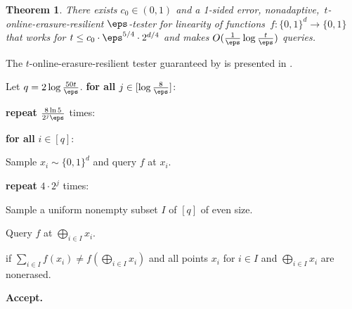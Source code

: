 \documentclass[11pt]{article}
\numberwithin{equation}{section}
\newtheorem{theorem}{Theorem}[section]
\theoremstyle{definition}
\theoremstyle{plain}
\begin{document}
\begin{theorem}\label{thm:linearity_3}
There exists %
$c_0 \in (0,1)$ and a 1-sided error, nonadaptive,~$t$-online-erasure-resilient $\eps$-tester for linearity of functions~$f\colon \{0,1\}^d \to \{0,1\}$ that  works for $t \leq c_0\cdot\eps^{5/4} \cdot  2^{d/4}$ and makes $O(\frac{1}{\eps}\log \frac{t}{\eps})$ queries.
\end{theorem}




The $t$-online-erasure-resilient tester guaranteed by  is presented in .


\begin{algorithm} 
	\caption{An Online-Erasure-Resilient Linearity Tester}
	\begin{algorithmic}[1]
		
		\State Let $q = 2\log\frac{50t}\eps$. \label{step:define_q}
		\State\textbf{for all} $j \in [\log \frac 8 \eps]$: \label{step:define_j}
		
		\State\label{step:repeat} \indent \textbf{repeat} $\frac{8 \ln 5}{2^j\eps}$ times:
 		
		\State \indent \indent \textbf{for all} {$i \in [q]$}:\label{step:loop_query_x_i}

		\State \indent \indent \indent Sample $x_i \sim \{0,1\}^d$ and query $f$ at $x_i$. \label{step:query_x_i}
		
		\State \indent \indent\textbf{repeat} $4 \cdot 2^j$ times:\label{step:query_sums}
		

        \State \indent \indent \indent Sample a uniform nonempty subset $I$ of $[q]$ of even size.
        
        
        \State \indent \indent \indent Query $f$ at $\bigoplus_{i \in I}{x_i}$.\label{step:sample-I}
		
		\State \indent \indent {} if $\sum_{i\in I}f(x_i) \neq f(\bigoplus_{i \in I}{x_i})$ and all points $x_i$ for $i\in I$ and $\bigoplus_{i \in I}{x_i}$ are nonerased.  \label{step:reject}

		\State \textbf{Accept.}
	\end{algorithmic}
	\label{alg:linearity_3}
\end{algorithm}
\end{document}

